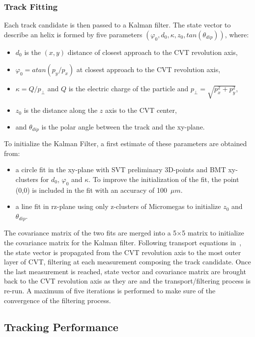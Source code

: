 \subsubsection{Track Fitting}

Each track candidate is then passed to a Kalman filter. The state vector to describe an helix is formed by five
parameters $(\varphi_0, d_0, \kappa, z_0, tan(\theta_{dip}))$, where:
\begin{itemize}
\item $d_0$ is the $(x,y)$ distance of closest approach to the CVT revolution axis,
\item $\varphi_0 = atan(p_y/p_x)$ at closest approach to the CVT revolution axis,
\item $\kappa=Q/p_\perp$ and $Q$ is the electric charge of the particle and $p_\perp=\sqrt{p_x^2+p_y^2}$,
\item $z_0$ is the distance along the $z$ axis to the CVT center,
\item and $\theta_{dip}$ is the polar angle between the track and the xy-plane.
\end{itemize}

To initialize the Kalman Filter, a first estimate of these parameters are obtained from:
\begin{itemize}
\item a circle fit in the xy-plane with SVT preliminary 3D-points and BMT xy-clusters for $d_0$, $\varphi_0$ and
$\kappa$. To improve the initialization of the fit, the point (0,0) is included in the fit with an accuracy of 100~$\mu
m$.
\item a line fit in rz-plane using only z-clusters of Micromegas to initialize $z_0$ and $\theta_{dip}$.
\end{itemize}
The covariance matrix of the two fits are merged into a 5$\times$5 matrix to initialize the covariance matrix for the
Kalman filter. Following transport equations in~\cite{ILC-Tracking}, the state vector is propagated from the CVT
revolution axis to the most outer layer of CVT, filtering at each measurement composing the track candidate. Once the
last measurement is reached, state vector and covariance matrix are brought back to the CVT revolution axis as they are
and the transport/filtering process is re-run. A maximum of five iterations is performed to make sure of the
convergence of the filtering process.

\subsection{Tracking Performance}

